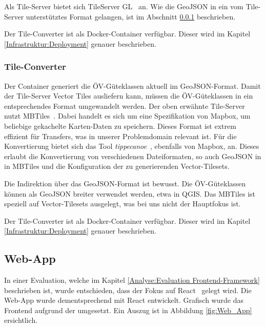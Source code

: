 Als Tile-Server bietet sich TileServer GL~\cite{tile-server-gl} an.
Wie die GeoJSON in ein vom Tile-Server unterstütztes Format gelangen, ist im Abschnitt \ref{Implementation:Tile-Converter} beschrieben.

Der Tile-Converter ist als Docker-Container verfügbar.
Dieser wird im Kapitel \ref{Infrastruktur:Deployment} genauer beschrieben.


\subsubsection{Tile-Converter}
\label{Implementation:Tile-Converter}

Der Container  generiert die \acs{ÖV}-Güteklassen aktuell im GeoJSON-Format.
Damit der Tile-Server Vector Tiles ausliefern kann, müssen die \acs{ÖV}-Güteklassen in ein entsprechendes Format umgewandelt werden.
Der oben erwähnte Tile-Server nutzt MBTiles~\cite{mbtiles}.
Dabei handelt es sich um eine Spezifikation von Mapbox, um beliebige gekachelte Karten-Daten zu speichern.
Dieses Format ist extrem effizient für Transfers, was in unserer Problemdomain relevant ist.
Für die Konvertierung bietet sich das Tool \emph{tippecanoe}~\cite{tippecanoe}, ebenfalls von Mapbox, an.
Dieses erlaubt die Konvertierung von verschiedenen Dateiformaten, so auch GeoJSON in in MBTiles und die Konfiguration der zu generierenden Vector-Tilesets.

Die Indirektion über das GeoJSON-Format ist bewusst.
Die ÖV-Güteklassen können als GeoJSON breiter verwendet werden, etwa in QGIS.
Das MBTiles ist speziell auf Vector-Tilesets ausgelegt, was bei uns nicht der Hauptfokus ist.

Der Tile-Converter ist als Docker-Container verfügbar.
Dieser wird im Kapitel \ref{Infrastruktur:Deployment} genauer beschrieben.

\subsection{Web-App}
\label{Implementation:Web-App}

In einer Evaluation, welche im Kapitel \ref{Analyse:Evaluation Frontend-Framework} beschrieben ist, wurde entschieden, dass der Fokus auf React~\cite{react} gelegt wird.
Die Web-App wurde dementsprechend mit React entwickelt.
Grafisch wurde das Frontend aufgrund der  umgesetzt.
Ein Auszug ist in Abbildung \ref{fig:Web_App} ersichtlich.

